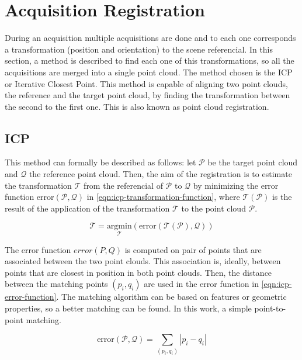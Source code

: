 \section{Acquisition Registration}
\label{section:acquisition-registration}

During an acquisition multiple acquisitions are done and to each one corresponds a transformation (position and orientation) to the scene referencial. In this section, a method is described to find each one of this transformations, so all the acquisitions are merged into a single point cloud. The method chosen is the ICP or Iterative Closest Point. This method is capable of aligning two point clouds, the reference and the target point cloud, by finding the transformation between the second to the first one. This is also known as point cloud registration.

\subsection{ICP}

\newcommand{\T}{\mathcal{T}}
\newcommand{\Pt}{\mathcal{P}}
\newcommand{\Q}{\mathcal{Q}}

This method can formally be described as follows: let $\Pt$ be the target point cloud and $\Q$ the reference point cloud. Then, the aim of the registration is to estimate the transformation $\T$ from the referencial of $\Pt$ to $\Q$ by minimizing the error function $\textrm{error}(\Pt, \Q)$ in \cref{eqn:icp-transformation-function}, where $\T(\Pt)$ is the result of the application of the transformation $\T$ to the point cloud $\Pt$.

\begin{equation}
\label{eqn:icp-transformation-function}
    \mathcal{T} = \underset{\T}{\textrm{argmin}}(\mathrm{error}(\T(\Pt), \Q))
\end{equation}

The error function $error(P, Q)$ is computed on pair of points that are associated between the two point clouds. This association is, ideally, between points that are closest in position in both point clouds. Then, the distance between the matching points $(p_i, q_i)$ are used in the error function in \cref{eqn:icp-error-function}. The matching algorithm can be based on features or geometric properties, so a better matching can be found. In this work, a simple point-to-point matching.

\begin{equation}
\label{eqn:icp-error-function}
    \textrm{error}(\Pt, \Q) = \sum_{(p_i, q_i)}{|p_i - q_i|}
\end{equation}

